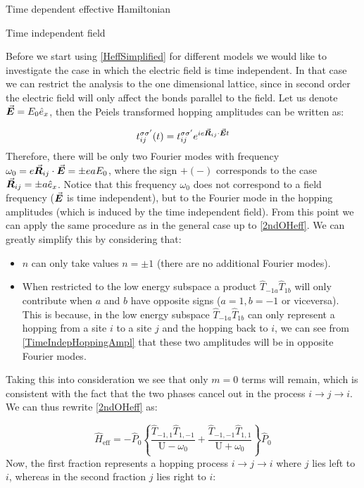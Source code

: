 \begin{section}{Time dependent effective Hamiltonian}
\begin{subsection}{Time independent field}

Before we start using \ref{HeffSimplified} for different models we would like to investigate the case in which the electric field is time independent. In that case we can restrict the analysis to the one dimensional lattice, since in second order the electric field will only affect the bonds parallel to the field. Let us denote $\vec{\boldsymbol{E}} = E_0 \hat{e}_x$, then the Peiels transformed hopping amplitudes can be written as:

\begin{equation}
\label{TimeIndepHoppingAmpl}
t_{ij}^{\sigma \sigma'} (t) = t_{ij}^{\sigma \sigma'} e^{ie \vec{\boldsymbol{R}}_{ij} \cdot \vec{\boldsymbol{E}} t}
\end{equation}
Therefore, there will be only two Fourier modes with frequency $\omega_0 = e \vec{\boldsymbol{R}}_{ij} \cdot \vec{\boldsymbol{E}} = \pm eaE_0$, where the sign $+(-)$ corresponds to the case $\vec{\boldsymbol{R}}_{ij} = \pm a \hat{e}_x$. Notice that this frequency $\omega_0$ does not correspond to a field frequency ($\vec{\boldsymbol{E}}$ is time independent), but to the Fourier mode in the hopping amplitudes (which is induced by the time independent field). From this point we can apply the same procedure as in the general case up to \ref{2ndOHeff}. We can greatly simplify this by considering that:
\begin{itemize}
	\item $n$ can only take values $ n = \pm 1$ (there are no additional Fourier modes).
	\item When restricted to the low energy subspace a product $\hat{T}_{-1 a} \hat{T}_{1 b}$ will only contribute when $a$ and $b$ have opposite signs ($a=1, b=-1$ or viceversa). This is because, in the low energy subspace $\hat{T}_{-1 a} \hat{T}_{1 b}$ can only represent a hopping from a site $i$ to a site $j$ and the hopping back to $i$, we can see from \ref{TimeIndepHoppingAmpl} that these two amplitudes will be in opposite Fourier modes.
\end{itemize}
Taking this into consideration we see that only $m=0$ terms will remain, which is consistent with the fact that the two phases cancel out in the process $i \rightarrow j \rightarrow i$. We can thus rewrite \ref{2ndOHeff} as:

\begin{equation}
\hat{H}_{\text{eff}} = -\hat{P}_0 \left\{ \frac{\hat{T}_{-1,1}\hat{T}_{1,-1} }{\text{U}-\omega_0} + \frac{\hat{T}_{-1,-1}\hat{T}_{1,1} }{\text{U}+\omega_0} \right\} \hat{P}_0
\end{equation}
Now, the first fraction represents a hopping process $i\rightarrow j \rightarrow i$ where $j$ lies left to $i$, whereas in the second fraction $j$ lies right to $i$:


\end{subsection}
\end{section}

